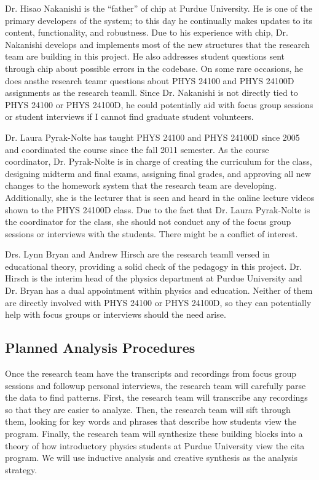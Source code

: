 Dr. Hisao Nakanishi is the ``father'' of \gls{chip} at Purdue University. He is one of the primary developers of the system; to this day he continually makes updates to its content, functionality, and robustness. Due to his experience with \gls{chip}, Dr. Nakanishi develops and implements most of the new structures that the research team are building in this project. He also addresses student questions sent through \gls{chip} about possible errors in the codebase. On some rare occasions, he does ansthe research teamr questions about PHYS 24100 and PHYS 24100D assignments as the research teamll. Since Dr. Nakanishi is not directly tied to PHYS 24100 or PHYS 24100D, he could potentially aid with focus group sessions or student interviews if I cannot find graduate student volunteers.

Dr. Laura Pyrak-Nolte has taught PHYS 24100 and PHYS 24100D since 2005 and coordinated the course since the fall 2011 semester. As the course coordinator, Dr. Pyrak-Nolte is in charge of creating the curriculum for the class, designing midterm and final exams, assigning final grades, and approving all new changes to the homework system that the research team are developing. Additionally, she is the lecturer that is seen and heard in the online lecture videos shown to the PHYS 24100D class. Due to the fact that Dr. Laura Pyrak-Nolte is the coordinator for the class, she should not conduct any of the focus group sessions or interviews with the students. There might be a conflict of interest.

Drs. Lynn Bryan and Andrew Hirsch are the research teamll versed in educational theory, providing a solid check of the pedagogy in this project. Dr. Hirsch is the interim head of the physics department at Purdue University and Dr. Bryan has a dual appointment within physics and education. Neither of them are directly involved with PHYS 24100 or PHYS 24100D, so they can potentially help with focus groups or interviews should the need arise.

\subsection{Planned Analysis Procedures}

Once the research team have the transcripts and recordings from focus group sessions and followup personal interviews, the research team will carefully parse the data to find patterns. First, the research team will transcribe any recordings so that they are easier to analyze. Then, the research team will sift through them, looking for key words and phrases that describe how students view the program. Finally, the research team will synthesize these building blocks into a theory of how introductory physics students at Purdue University view the \gls{cita} program. We will use inductive analysis and creative synthesis as the analysis strategy.

